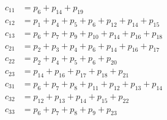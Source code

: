 \begin{align*}
c_{11}&=p_{6}+p_{14}+p_{19}\\
c_{12}&=p_{1}+p_{4}+p_{5}+p_{6}+p_{12}+p_{14}+p_{15}\\
c_{13}&=p_{6}+p_{7}+p_{9}+p_{10}+p_{14}+p_{16}+p_{18}\\
c_{21}&=p_{2}+p_{3}+p_{4}+p_{6}+p_{14}+p_{16}+p_{17}\\
c_{22}&=p_{2}+p_{4}+p_{5}+p_{6}+p_{20}\\
c_{23}&=p_{14}+p_{16}+p_{17}+p_{18}+p_{21}\\
c_{31}&=p_{6}+p_{7}+p_{8}+p_{11}+p_{12}+p_{13}+p_{14}\\
c_{32}&=p_{12}+p_{13}+p_{14}+p_{15}+p_{22}\\
c_{33}&=p_{6}+p_{7}+p_{8}+p_{9}+p_{23}
\end{align*}
